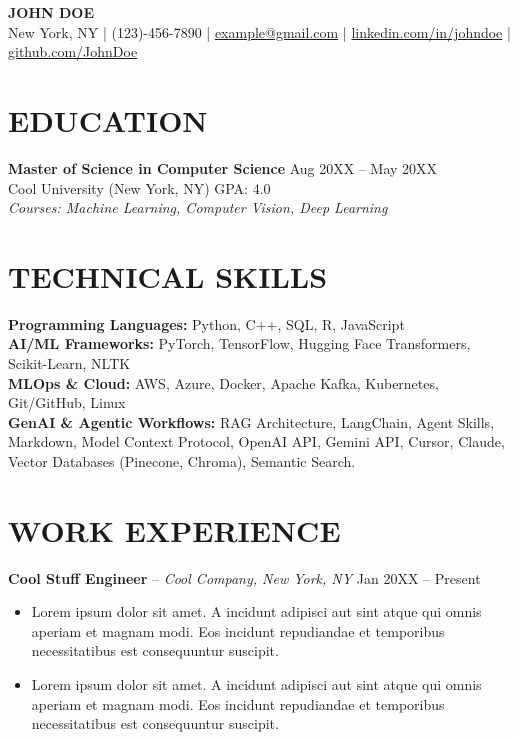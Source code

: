 \documentclass[10pt,letterpaper]{extarticle}
\begin{document}
\begin{center}
    {\Large \textbf{JOHN DOE}} \\ \vspace{2pt} %
    New York, NY | (123)-456-7890 | \href{mailto:example@gmail.com}{example@gmail.com} | \href{https://linkedin.com/in/johndoe}{linkedin.com/in/johndoe} | \href{https://github.com/JohnDoe}{github.com/JohnDoe} %
\end{center}

\section*{EDUCATION}
\textbf{Master of Science in Computer Science} \hfill Aug 20XX -- May 20XX \\ %
Cool University (New York, NY) \hfill GPA: 4.0 \\ %
\textit{Courses: Machine Learning, Computer Vision, Deep Learning} \\ %

\section*{TECHNICAL SKILLS}
\textbf{Programming Languages:} Python, C++, SQL, R, JavaScript \\ %
\textbf{AI/ML Frameworks:} PyTorch, TensorFlow, Hugging Face Transformers, Scikit-Learn, NLTK \\ %
\textbf{MLOps \& Cloud:} AWS, Azure, Docker, Apache Kafka, Kubernetes, Git/GitHub, Linux \\ %
\textbf{GenAI \& Agentic Workflows:} RAG Architecture, LangChain, Agent Skills, Markdown, Model Context Protocol, OpenAI API, Gemini API, Cursor, Claude, Vector Databases (Pinecone, Chroma), Semantic Search. %

\section*{WORK EXPERIENCE}
\textbf{Cool Stuff Engineer} -- \textit{Cool Company, New York, NY} \hfill Jan 20XX -- Present %
\begin{itemize}[leftmargin=*, nosep]
    \item Lorem ipsum dolor sit amet. A incidunt adipisci aut sint atque qui omnis aperiam et magnam modi. Eos incidunt repudiandae et temporibus necessitatibus est consequuntur suscipit. %
    \item Lorem ipsum dolor sit amet. A incidunt adipisci aut sint atque qui omnis aperiam et magnam modi. Eos incidunt repudiandae et temporibus necessitatibus est consequuntur suscipit. %
\end{itemize}
\vspace{2pt}
\end{document}
